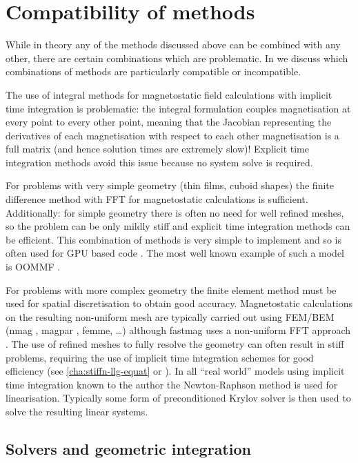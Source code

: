 \section{Compatibility of methods}
\label{sec:comp-meth}

While in theory any of the methods discussed above can be combined with any other, there are certain combinations which are problematic.
In  we discuss which combinations of methods are particularly compatible or incompatible.

The use of integral methods for magnetostatic field calculations with implicit time integration is problematic: the integral formulation couples magnetisation at every point to every other point, meaning that the Jacobian representing the derivatives of each magnetisation with respect to each other magnetisation is a full matrix (and hence solution times are extremely slow)!
Explicit time integration methods avoid this issue because no system solve is required.

For problems with very simple geometry (\ie thin films, cuboid shapes) the finite difference method with FFT for magnetostatic calculations is sufficient.
Additionally: for simple geometry there is often no need for well refined meshes, so the problem can be only mildly stiff and explicit time integration methods can be efficient.
This combination of methods is very simple to implement and so is often used for GPU based code \cite{Vansteenkiste2011}.
The most well known example of such a model is OOMMF \cite{oommf-website}.

For problems with more complex geometry the finite element method must be used for spatial discretisation to obtain good accuracy. 
Magnetostatic calculations on the resulting non-uniform mesh are typically carried out using FEM/BEM (nmag \cite{Fischbacher2007}, magpar \cite{Scholz2003}, femme, \ldots) although fastmag uses a non-uniform FFT approach \cite{Chang2011}.
The use of refined meshes to fully resolve the geometry can often result in stiff problems, requiring the use of implicit time integration schemes for good efficiency (see \cref{cha:stiffn-llg-equat} or \cite{Shepherd2014}).
In all ``real world'' models using implicit time integration known to the author the Newton-Raphson method is used for linearisation.
Typically some form of preconditioned Krylov solver is then used to solve the resulting linear systems.


\subsection{Solvers and geometric integration}

